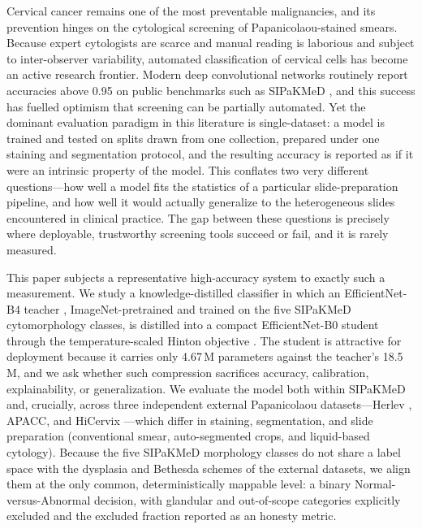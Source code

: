 Cervical cancer remains one of the most preventable malignancies, and its prevention hinges on the cytological screening of Papanicolaou-stained smears. Because expert cytologists are scarce and manual reading is laborious and subject to inter-observer variability, automated classification of cervical cells has become an active research frontier. Modern deep convolutional networks routinely report accuracies above 0.95 on public benchmarks such as SIPaKMeD \citep{plissiti2018sipakmed}, and this success has fuelled optimism that screening can be partially automated. Yet the dominant evaluation paradigm in this literature is single-dataset: a model is trained and tested on splits drawn from one collection, prepared under one staining and segmentation protocol, and the resulting accuracy is reported as if it were an intrinsic property of the model. This conflates two very different questions---how well a model fits the statistics of a particular slide-preparation pipeline, and how well it would actually generalize to the heterogeneous slides encountered in clinical practice. The gap between these questions is precisely where deployable, trustworthy screening tools succeed or fail, and it is rarely measured.

This paper subjects a representative high-accuracy system to exactly such a measurement. We study a knowledge-distilled classifier in which an EfficientNet-B4 teacher \citep{tan2019efficientnet}, ImageNet-pretrained \citep{deng2009imagenet} and trained on the five SIPaKMeD cytomorphology classes, is distilled into a compact EfficientNet-B0 student through the temperature-scaled Hinton objective \citep{hinton2015distilling}. The student is attractive for deployment because it carries only 4.67\,M parameters against the teacher's 18.5\,M, and we ask whether such compression sacrifices accuracy, calibration, explainability, or generalization. We evaluate the model both within SIPaKMeD and, crucially, across three independent external Papanicolaou datasets---Herlev \citep{jantzen2005herlev}, APACC, and HiCervix \citep{cai2024hicervix}---which differ in staining, segmentation, and slide preparation (conventional smear, auto-segmented crops, and liquid-based cytology). Because the five SIPaKMeD morphology classes do not share a label space with the dysplasia and Bethesda \citep{nayar2015bethesda} schemes of the external datasets, we align them at the only common, deterministically mappable level: a binary Normal-versus-Abnormal decision, with glandular and out-of-scope categories explicitly excluded and the excluded fraction reported as an honesty metric.

